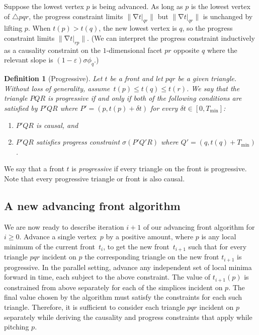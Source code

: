 \documentclass[twocolumn]{article}
\def\S{\ensuremath{\sigma}}
\def\minT{\ensuremath{T_{\text{min}}}}
\def\e{\ensuremath{\varepsilon}}
\def\fp{\ensuremath{P}}
\def\fq{\ensuremath{Q}}
\def\fr{\ensuremath{R}}
\DeclareMathOperator{\grad}{\ensuremath{\nabla}}
\def\norm#1{\ensuremath{\mathopen\| #1 \mathclose\|}}
\def\dt{\ensuremath{\delta t}}
\def\rest#1#2{\ensuremath{\left. #1 \right|_{#2}}}
\newtheorem{definition}{Definition}
\begin{document}
Suppose the lowest vertex $p$ is being advanced.  As long as $p$ is
the lowest vertex of $\triangle{pqr}$, the progress constraint limits
$\norm{\grad \rest{t}{qr}}$ but $\norm{\grad \rest{t}{qr}}$ is
unchanged by lifting $p$.  When $t(p) > t(q)$, the new lowest vertex
is $q$, so the progress constraint limits $\norm{\grad \rest{t}{rp}}$.
(We can interpret the progress constraint inductively as a
causality constraint on the $1$-dimensional facet $pr$ opposite $q$
where the relevant slope is $(1-\e) \S \phi_q$.)

\begin{definition}[Progressive]
  Let $t$ be a front and let $pqr$ be a given
  triangle.  Without loss of generality, assume~$t(p) \le t(q)
  \le t(r)$.  We say that the triangle
  $\fp\fq\fr$ is \emph{progressive} if and only if
  both of the following conditions are satisfied by
  $\fp'\fq\fr$ where $\fp' = (p, t(p) + \dt)$
  for every $\dt \in [0,\minT]$:
  \begin{enumerate}
  \item $\fp'\fq\fr$ is causal, and
  \item $\fp'\fq\fr$ satisfies progress constraint
    $\S(\fp'\fq'\fr)$ where $\fq' = (q, t(q) + \minT)$.
  \end{enumerate}
\end{definition}

We say that a front $t$ is \emph{progressive} if every triangle on the
front is progressive.  Note that every progressive triangle or front
is also causal.




\subsection{A new advancing front algorithm}

We are now ready to describe iteration $i+1$ of our advancing front
algorithm for $i \ge 0$.  Advance a single vertex~$p$ by a positive
amount, where $p$ is any local minimum of the current front~$t_i$, to
get the new front~$t_{i+1}$ such that for every triangle $pqr$
incident on $p$ the corresponding triangle on the new front $t_{i+1}$
is progressive.  In the parallel setting, advance any independent set
of local minima forward in time, each subject to the above constraint.
The value of $t_{i+1}(p)$ is constrained from above separately for
each of the simplices incident on $p$.  The final value chosen by the
algorithm must satisfy the constraints for each such triangle.
Therefore, it is sufficient to consider each triangle $pqr$ incident
on $p$ separately while deriving the causality and progress
constraints that apply while pitching $p$.
\end{document}
